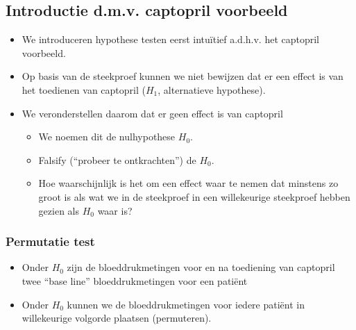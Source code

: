 \documentclass[
  12pt,dutch,coursenotes]{book}
\theoremstyle{definition}
\theoremstyle{definition}
\theoremstyle{definition}
\theoremstyle{remark}
\begin{document}
\hypertarget{introductie-d.m.v.-captopril-voorbeeld}{%
\subsection{Introductie d.m.v. captopril voorbeeld}\label{introductie-d.m.v.-captopril-voorbeeld}}

\begin{itemize}
\item
  We introduceren hypothese testen eerst intuïtief a.d.h.v. het captopril voorbeeld.
\item
  Op basis van de steekproef kunnen we niet bewijzen dat er een effect is van het toedienen van captopril (\(H_1\), alternatieve hypothese).
\item
  We veronderstellen daarom dat er geen effect is van captopril

  \begin{itemize}
  \item
    We noemen dit de nulhypothese \(H_0\).
  \item
    Falsify (``probeer te ontkrachten'') de \(H_0\).
  \item
    Hoe waarschijnlijk is het om een effect waar te nemen dat minstens zo groot is als wat we in de steekproef in een willekeurige steekproef hebben gezien als \(H_0\) waar is?
  \end{itemize}
\end{itemize}

\hypertarget{permutatie-test}{%
\subsubsection{Permutatie test}\label{permutatie-test}}

\begin{itemize}
\item
  Onder \(H_0\) zijn de bloeddrukmetingen voor en na toediening van captopril twee ``base line'' bloeddrukmetingen voor een patiënt
\item
  Onder \(H_0\) kunnen we de bloeddrukmetingen voor iedere patiënt in willekeurige volgorde plaatsen (permuteren).
\end{itemize}
\end{document}
